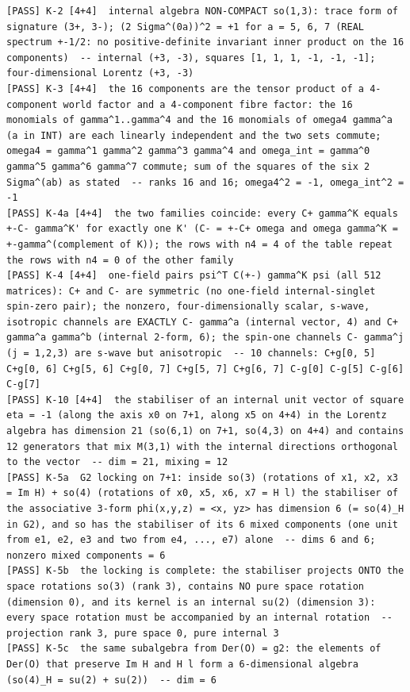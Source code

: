 \documentclass[
  10pt,
]{article}
\begin{document}
\begin{verbatim}
[PASS] K-2 [4+4]  internal algebra NON-COMPACT so(1,3): trace form of signature (3+, 3-); (2 Sigma^(0a))^2 = +1 for a = 5, 6, 7 (REAL spectrum +-1/2: no positive-definite invariant inner product on the 16 components)  -- internal (+3, -3), squares [1, 1, 1, -1, -1, -1]; four-dimensional Lorentz (+3, -3)
[PASS] K-3 [4+4]  the 16 components are the tensor product of a 4-component world factor and a 4-component fibre factor: the 16 monomials of gamma^1..gamma^4 and the 16 monomials of omega4 gamma^a (a in INT) are each linearly independent and the two sets commute; omega4 = gamma^1 gamma^2 gamma^3 gamma^4 and omega_int = gamma^0 gamma^5 gamma^6 gamma^7 commute; sum of the squares of the six 2 Sigma^(ab) as stated  -- ranks 16 and 16; omega4^2 = -1, omega_int^2 = -1
[PASS] K-4a [4+4]  the two families coincide: every C+ gamma^K equals +-C- gamma^K' for exactly one K' (C- = +-C+ omega and omega gamma^K = +-gamma^(complement of K)); the rows with n4 = 4 of the table repeat the rows with n4 = 0 of the other family
[PASS] K-4 [4+4]  one-field pairs psi^T C(+-) gamma^K psi (all 512 matrices): C+ and C- are symmetric (no one-field internal-singlet spin-zero pair); the nonzero, four-dimensionally scalar, s-wave, isotropic channels are EXACTLY C- gamma^a (internal vector, 4) and C+ gamma^a gamma^b (internal 2-form, 6); the spin-one channels C- gamma^j (j = 1,2,3) are s-wave but anisotropic  -- 10 channels: C+g[0, 5] C+g[0, 6] C+g[5, 6] C+g[0, 7] C+g[5, 7] C+g[6, 7] C-g[0] C-g[5] C-g[6] C-g[7]
[PASS] K-10 [4+4]  the stabiliser of an internal unit vector of square eta = -1 (along the axis x0 on 7+1, along x5 on 4+4) in the Lorentz algebra has dimension 21 (so(6,1) on 7+1, so(4,3) on 4+4) and contains 12 generators that mix M(3,1) with the internal directions orthogonal to the vector  -- dim = 21, mixing = 12
[PASS] K-5a  G2 locking on 7+1: inside so(3) (rotations of x1, x2, x3 = Im H) + so(4) (rotations of x0, x5, x6, x7 = H l) the stabiliser of the associative 3-form phi(x,y,z) = <x, yz> has dimension 6 (= so(4)_H in G2), and so has the stabiliser of its 6 mixed components (one unit from e1, e2, e3 and two from e4, ..., e7) alone  -- dims 6 and 6; nonzero mixed components = 6
[PASS] K-5b  the locking is complete: the stabiliser projects ONTO the space rotations so(3) (rank 3), contains NO pure space rotation (dimension 0), and its kernel is an internal su(2) (dimension 3): every space rotation must be accompanied by an internal rotation  -- projection rank 3, pure space 0, pure internal 3
[PASS] K-5c  the same subalgebra from Der(O) = g2: the elements of Der(O) that preserve Im H and H l form a 6-dimensional algebra (so(4)_H = su(2) + su(2))  -- dim = 6

\end{verbatim}
\end{document}
